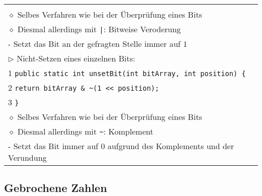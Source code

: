 \begin{longtable}{ | p{} p{} | }
{	\hspace{0.4cm} 3 \hspace{0.1cm} \texttt{\}} \\
	\hspace{0.4cm} $\diamond$ Selbes Verfahren wie bei der Überprüfung eines Bits \\
	\hspace{0.4cm} $\diamond$ Diesmal allerdings mit \texttt{|}: Bitweise Veroderung \\
	\hspace{0.6cm} - Setzt das Bit an der gefragten Stelle immer auf $1$ \\
	$\triangleright$ Nicht-Setzen eines einzelnen Bits: \\
	\hspace{0.4cm} 1 \hspace{0.1cm} \texttt{public static int unsetBit(int bitArray, int position) \{} \\
	\hspace{0.4cm} 2 \hspace{0.5cm} \texttt{return bitArray \& \textasciitilde (1 << position);} \\
	\hspace{0.4cm} 3 \hspace{0.1cm} \texttt{\}} \\
	\hspace{0.4cm} $\diamond$ Selbes Verfahren wie bei der Überprüfung eines Bits \\
	\hspace{0.4cm} $\diamond$ Diesmal allerdings mit \texttt{\textasciitilde}: Komplement \\
	\hspace{0.6cm} - Setzt das Bit immer auf $0$ aufgrund des Komplements und der Verundung} \\ \hline

	\end{longtable}



\subsection*{Gebrochene Zahlen}

